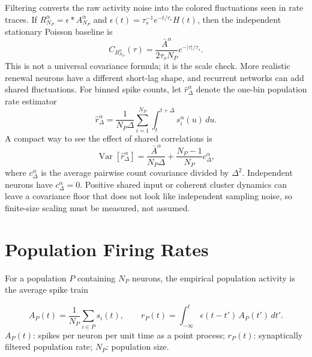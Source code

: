 Filtering converts the raw activity noise into the colored fluctuations seen
in rate traces. If \(R_{N_P}^\alpha=\epsilon*A_{N_P}^\alpha\) and
\(\epsilon(t)=\tau_s^{-1}e^{-t/\tau_s}H(t)\), then the independent stationary
Poisson baseline is
%
\begin{equation}
  C_{R_{N_P}^\alpha}(\tau)
  =
  \frac{\bar A^\alpha}{2\tau_s N_P}
  e^{-|\tau|/\tau_s}.
  \label{eq:ch03-filtered-finite-size-cov}
\end{equation}
%
This is not a universal covariance formula; it is the scale check. More
realistic renewal neurons have a different short-lag shape, and recurrent
networks can add shared fluctuations. For binned spike counts, let
\(\hat r_\Delta^\alpha\) denote the one-bin population rate estimator
\[
  \hat r_\Delta^\alpha
  =
  \frac{1}{N_P\Delta}
  \sum_{i=1}^{N_P}\int_t^{t+\Delta}s_i^\alpha(u)\,du.
\]
A compact way to see the effect of shared correlations is
%
\begin{equation}
  \operatorname{Var}\!\left[\hat r_\Delta^\alpha\right]
  =
  \frac{\bar A^\alpha}{N_P\Delta}
  +
  \frac{N_P-1}{N_P}
  c_\Delta^\alpha,
  \label{eq:ch03-shared-correlation-floor}
\end{equation}
%
where \(c_\Delta^\alpha\) is the average pairwise count covariance divided by
\(\Delta^2\). Independent neurons have \(c_\Delta^\alpha=0\). Positive shared
input or coherent cluster dynamics can leave a covariance floor that does not
look like independent sampling noise, so finite-size scaling must be measured,
not assumed.

\section{Population Firing Rates}
\label{sec:population-rates}

For a population $P$ containing $N_P$ neurons, the empirical population
activity is the average spike train
%
\begin{keyequation}
\begin{equation}
  A_P(t)
  =
  \frac{1}{N_P}\sum_{i\in P} s_i(t),
  \qquad
  r_P(t)
  =
  \int_{-\infty}^{t}\epsilon(t-t')\,A_P(t')\,dt'.
  \label{eq:ch03-population-activity-rate}
\end{equation}
\tcblower
$A_P(t)$: spikes per neuron per unit time as a point process; $r_P(t)$:
synaptically filtered population rate; $N_P$: population size.
\end{keyequation}

